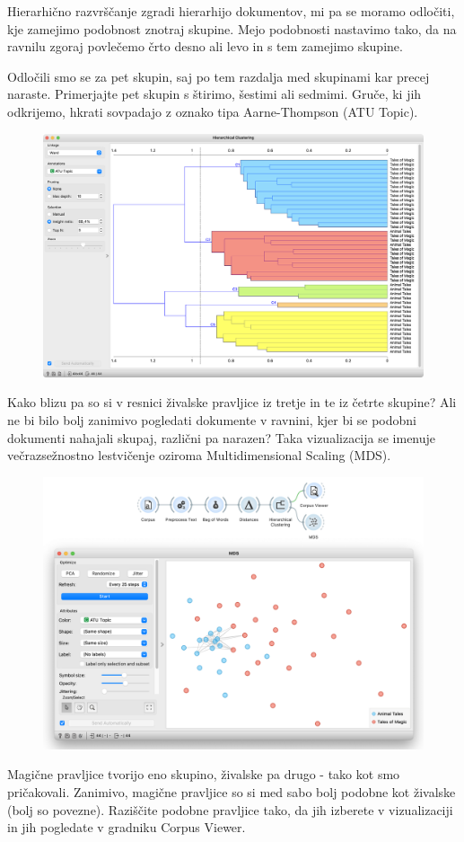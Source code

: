\newpage

Hierarhično razvrščanje zgradi hierarhijo dokumentov, mi pa se moramo odločiti, kje zamejimo podobnost znotraj skupine. Mejo podobnosti nastavimo tako, da na ravnilu zgoraj povlečemo črto desno ali levo in s tem zamejimo skupine.

Odločili smo se za pet skupin, saj po tem razdalja med skupinami kar precej naraste. Primerjajte pet skupin s štirimo, šestimi ali sedmimi. Gruče, ki jih odkrijemo, hkrati sovpadajo z oznako tipa Aarne-Thompson (ATU Topic).

\begin{figure}[h]
    \includegraphics[width=\linewidth]{hc-clusters.png}%
    \caption{ }
    \label{fig:005-hc-clusters}
\end{figure}

\newpage

Kako blizu pa so si v resnici živalske pravljice iz tretje in te iz četrte skupine? Ali ne bi bilo bolj zanimivo pogledati dokumente v ravnini, kjer bi se podobni dokumenti nahajali skupaj, različni pa narazen? Taka vizualizacija se imenuje večrazsežnostno lestvičenje oziroma Multidimensional Scaling (MDS).

\begin{figure}[h]
    \includegraphics[width=\linewidth]{mds.png}%
    \caption{ }
    \label{fig:005-mds}
\end{figure}

Magične pravljice tvorijo eno skupino, živalske pa drugo - tako kot smo pričakovali. Zanimivo, magične pravljice so si med sabo bolj podobne kot živalske (bolj so povezne). Raziščite podobne pravljice tako, da jih izberete v vizualizaciji in jih pogledate v gradniku Corpus Viewer.